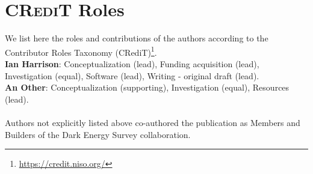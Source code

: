 \section{CR\textsc{edi}T Roles}
We list here the roles and contributions of the authors according to the Contributor Roles Taxonomy (CRediT)\footnote{\url{https://credit.niso.org/}}. \\ 

\noindent\textbf{Ian Harrison}: Conceptualization (lead), Funding acquisition (lead), Investigation (equal), Software (lead), Writing - original draft (lead).\\ 
\textbf{An Other}: Conceptualization (supporting), Investigation (equal), Resources (lead).\\
\\
Authors not explicitly listed above co-authored the publication as Members and Builders of the Dark Energy Survey collaboration.
